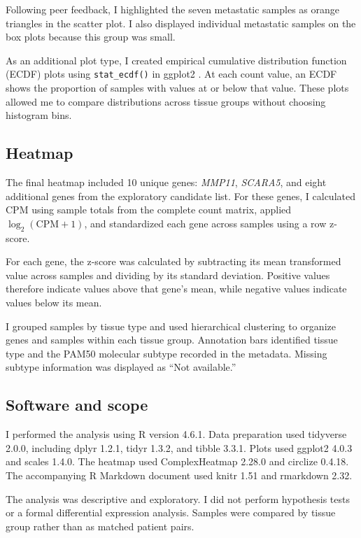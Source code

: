 \documentclass[11pt]{article}
\begin{document}
Following peer feedback, I highlighted the seven
metastatic samples as orange triangles in the scatter
plot. I also displayed individual metastatic samples
on the box plots because this group was small.

As an additional plot type, I created empirical
cumulative distribution function (ECDF) plots using
\texttt{stat\_ecdf()} in ggplot2 \cite{ecdf}.
At each count value, an ECDF shows the proportion
of samples with values at or below that value.
These plots allowed me to compare distributions
across tissue groups without choosing histogram bins.

\subsection{Heatmap}

The final heatmap included 10 unique genes:
\textit{MMP11}, \textit{SCARA5}, and eight additional
genes from the exploratory candidate list.
For these genes, I calculated CPM using sample totals
from the complete count matrix, applied
$\log_2(\mathrm{CPM}+1)$, and standardized each gene
across samples using a row z-score.

For each gene, the z-score was calculated by subtracting
its mean transformed value across samples and dividing
by its standard deviation. Positive values therefore
indicate values above that gene's mean, while negative
values indicate values below its mean.

I grouped samples by tissue type and used hierarchical
clustering to organize genes and samples within each
tissue group. Annotation bars identified tissue type
and the PAM50 molecular subtype recorded in the metadata.
Missing subtype information was displayed as
``Not available.''

\subsection{Software and scope}

I performed the analysis using R version 4.6.1.
Data preparation used tidyverse 2.0.0, including
dplyr 1.2.1, tidyr 1.3.2, and tibble 3.3.1.
Plots used ggplot2 4.0.3 and scales 1.4.0.
The heatmap used ComplexHeatmap 2.28.0 and
circlize 0.4.18.
The accompanying R Markdown document used
knitr 1.51 and rmarkdown 2.32.

The analysis was descriptive and exploratory.
I did not perform hypothesis tests or a formal
differential expression analysis. Samples were
compared by tissue group rather than as matched
patient pairs.
\end{document}

